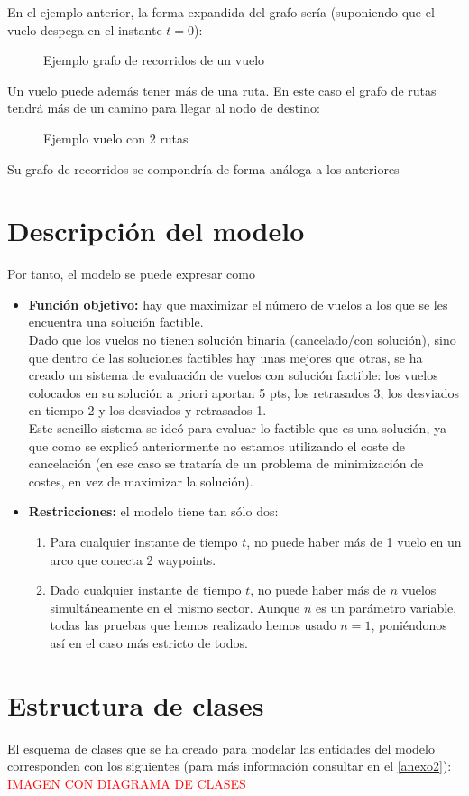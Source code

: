 En el ejemplo anterior, la forma expandida del grafo sería (suponiendo que el vuelo despega en el instante $t=0$): 
\begin{figure}[H]
	\centering
	
	\caption{Ejemplo grafo de recorridos de un vuelo}
	\label{fig: Ejemplo grafo de recorridos de un vuelo}
\end{figure}

Un vuelo puede además tener más de una ruta. En este caso el grafo de rutas tendrá más de un camino para llegar al nodo de destino:
\begin{figure}[H]
	\centering
	
	\caption{Ejemplo vuelo con 2 rutas}
	\label{fig: Ejemplo vuelo con 2 rutas}
\end{figure}

Su grafo de recorridos se compondría de forma análoga a los anteriores

\section{Descripción del modelo}
Por tanto, el modelo se puede expresar como
\begin{itemize}
	\item \textbf{Función objetivo: }hay que maximizar el número de vuelos a los que se les encuentra una solución factible.\\
	 Dado que los vuelos no tienen solución binaria (cancelado/con solución), sino que dentro de las soluciones factibles hay unas mejores que otras, se ha creado un sistema de evaluación de vuelos con solución factible: los vuelos colocados en su solución a priori aportan 5 pts, los retrasados 3, los desviados en tiempo 2 y los desviados y retrasados 1.\\
	 Este sencillo sistema se ideó para evaluar lo factible que es una solución, ya que como se explicó anteriormente no estamos utilizando el coste de cancelación (en ese caso se trataría de un problema de minimización de costes, en vez de maximizar la solución).
	\item \textbf{Restricciones:} el modelo tiene tan sólo dos:
	\begin{enumerate}
		\item Para cualquier instante de tiempo $t$, no puede haber más de 1 vuelo en un arco que conecta 2 waypoints. 
		\item Dado cualquier instante de tiempo $t$, no puede haber más de $n$ vuelos simultáneamente en el mismo sector. Aunque $n$ es un parámetro variable, todas las pruebas que hemos realizado hemos usado $n=1$, poniéndonos así en el caso más estricto de todos.
	\end{enumerate}
	
	
\end{itemize}

\section{Estructura de clases}
El esquema de clases que se ha creado para modelar las entidades del modelo corresponden con los siguientes (para más información consultar en el \autoref{anexo2}):
\textcolor{red}{IMAGEN CON DIAGRAMA DE CLASES}
